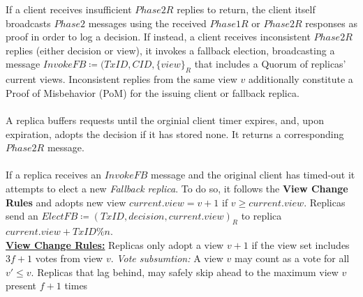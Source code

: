 If a client receives insufficient $Phase2R$ replies to return, the client itself broadcasts $Phase2$ messages using the received $Phase1R$ or $Phase2R$ responses as proof in order to log a decision. If instead, a client receives inconsistent $Phase2R$ replies (either decision or view), it invokes a fallback election, broadcasting a message $InvokeFB \coloneqq (TxID, CID, \{view\}_R$ that includes a Quorum of replicas' current views.
Inconsistent replies from the same view $v$ additionally constitute a Proof of Misbehavior (PoM) for the issuing client or fallback replica. \\
\\
A replica buffers requests until the orginial client timer expires, and, upon expiration, adopts the decision if it has stored none. It returns a corresponding $Phase2R$ message. \\
\\
If a replica receives an $InvokeFB$ message and the original client has timed-out it attempts to elect a new \textit{Fallback replica}. To do so, it follows the \textbf{View Change Rules} and adopts new view $current.view = v+1$ if $v \geq current.view$. 
Replicas send an $ElectFB \coloneqq (TxID, decision, current.view)_R$ to replica $current.view + TxID \% n$. \\
\underline{\textbf{View Change Rules:}} \one Replicas only adopt a view $v+1$ if the view set includes $3f+1$ votes from view $v$. \textit{Vote subsumtion:} A view $v$ may count as a vote for all $v' \leq v$. \two Replicas that lag behind, may safely skip ahead to the maximum view $v$ present $f+1$ times \\
 
